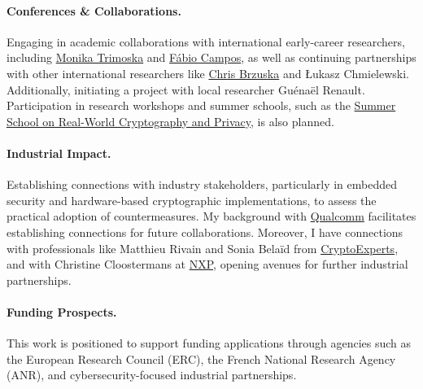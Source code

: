 \documentclass[11pt, a4paper]{article}
\begin{document}
\paragraph{Conferences \& Collaborations.} Engaging in academic collaborations with international 
early-career researchers, including \href{https://mtrimoska.com/}{Monika Trimoska} and 
\href{https://www.sopmac.de/index.html}{Fábio Campos}, as well as continuing partnerships 
with other international researchers like \href{https://research.aalto.fi/en/persons/chris-brzuska}{Chris Brzuska} 
and Łukasz Chmielewski. Additionally, initiating a project with local researcher Guénaël Renault. 
Participation in research workshops and summer schools, such as the 
\href{https://summerschool-croatia.cs.ru.nl/}{Summer School on Real-World Cryptography and Privacy}, 
is also planned.

\paragraph{Industrial Impact.} Establishing connections with industry stakeholders, particularly in 
embedded security and hardware-based cryptographic implementations, to assess the practical adoption of 
countermeasures. My background with \href{https://www.qualcomm.com/}{Qualcomm} facilitates establishing 
connections for future collaborations. Moreover, I have connections with professionals like Matthieu Rivain 
and Sonia Belaïd from \href{https://www.cryptoexperts.com/people/}{CryptoExperts}, and with Christine 
Cloostermans at \href{https://www.nxp.com/company/about-nxp/smarter-world-blog/BL-EMBRACING-EQUITY-ON-EVERY-LEVEL}{NXP}, 
opening avenues for further industrial partnerships.

\paragraph{Funding Prospects.} This work is positioned to support funding applications through agencies such as 
the European Research Council (ERC), the French National Research Agency (ANR), and 
cybersecurity-focused industrial partnerships.




\end{document}
